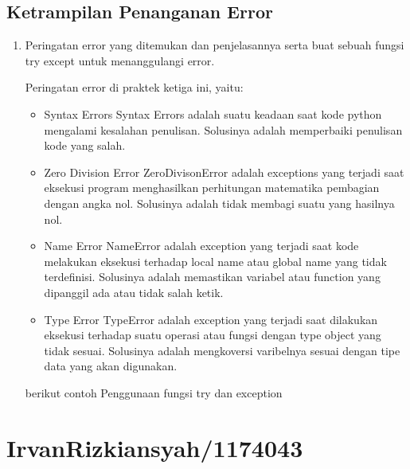 \subsection{Ketrampilan Penanganan Error}
\begin{enumerate}
	\item Peringatan error yang ditemukan dan penjelasannya serta buat sebuah fungsi try except untuk menanggulangi error.
	
	Peringatan error di praktek ketiga ini, yaitu:
	\begin{itemize}
		\item Syntax Errors
		Syntax Errors adalah suatu keadaan saat kode python mengalami kesalahan penulisan. Solusinya adalah memperbaiki penulisan kode yang salah.
		
		\item Zero Division Error
		ZeroDivisonError adalah exceptions yang terjadi saat eksekusi program menghasilkan perhitungan matematika pembagian dengan angka nol. Solusinya adalah tidak membagi suatu yang hasilnya nol.
		
		\item Name Error
		NameError adalah exception yang terjadi saat kode melakukan eksekusi terhadap local name atau global name yang tidak terdefinisi. Solusinya adalah memastikan variabel atau function yang dipanggil ada atau tidak salah ketik.
		
		\item Type Error
		TypeError adalah exception yang terjadi saat dilakukan eksekusi terhadap suatu operasi atau fungsi dengan type object yang tidak sesuai. Solusinya adalah mengkoversi varibelnya sesuai dengan tipe data yang akan digunakan.
	\end{itemize}
	
		berikut contoh Penggunaan fungsi try dan exception
		
		
\end{enumerate}

\section{IrvanRizkiansyah/1174043}
